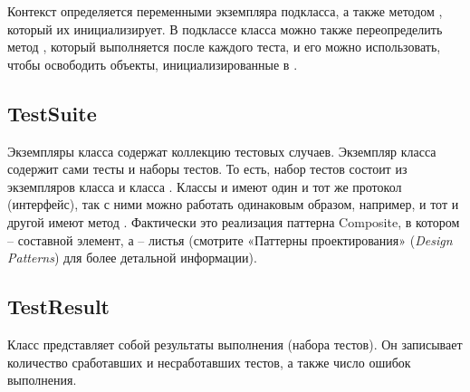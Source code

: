 \documentclass[a4paper,10pt,twoside]{book}
\begin{document}
Контекст определяется переменными экземпляра подкласса,
а также методом , который их инициализирует.
В подклассе класса  можно также переопределить метод ,
который выполняется после каждого теста,
и его можно использовать, чтобы освободить объекты, инициализированные в .

\subsection{TestSuite}

Экземпляры класса  содержат коллекцию тестовых случаев.
Экземпляр класса  содержит сами тесты и наборы тестов.
То есть, набор тестов состоит из экземпляров класса  и класса .
Классы  и  имеют один и тот же протокол (интерфейс),
так с ними можно работать одинаковым образом, например, и тот и другой имеют метод .
Фактически это реализация паттерна Composite, в котором  – составной элемент,
а  – листья (смотрите «Паттерны проектирования» (\textit{Design Patterns}\cite{Gamm95a})
для более детальной информации).

\subsection{TestResult}

Класс  представляет собой результаты выполнения  (набора тестов).
Он записывает количество сработавших и несработавших тестов, а также число ошибок выполнения.
\end{document}
